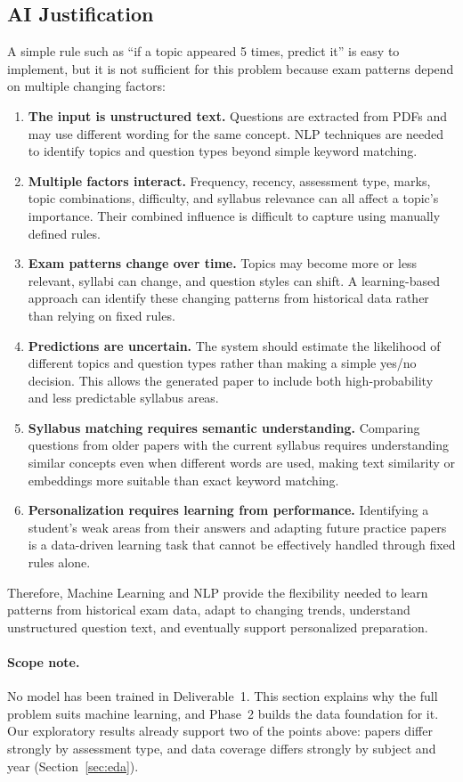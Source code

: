 \documentclass[11pt,a4paper]{article}
\begin{document}
\subsection{AI Justification}
\label{sec:ai}
A simple rule such as ``if a topic appeared 5 times, predict it'' is easy to implement, but it is not sufficient for this problem because exam patterns depend on multiple changing factors:
\begin{enumerate}
  \item \textbf{The input is unstructured text.} Questions are extracted from PDFs and may use different wording for the same concept. NLP techniques are needed to identify topics and question types beyond simple keyword matching.
  \item \textbf{Multiple factors interact.} Frequency, recency, assessment type, marks, topic combinations, difficulty, and syllabus relevance can all affect a topic's importance. Their combined influence is difficult to capture using manually defined rules.
  \item \textbf{Exam patterns change over time.} Topics may become more or less relevant, syllabi can change, and question styles can shift. A learning-based approach can identify these changing patterns from historical data rather than relying on fixed rules.
  \item \textbf{Predictions are uncertain.} The system should estimate the likelihood of different topics and question types rather than making a simple yes/no decision. This allows the generated paper to include both high-probability and less predictable syllabus areas.
  \item \textbf{Syllabus matching requires semantic understanding.} Comparing questions from older papers with the current syllabus requires understanding similar concepts even when different words are used, making text similarity or embeddings more suitable than exact keyword matching.
  \item \textbf{Personalization requires learning from performance.} Identifying a student's weak areas from their answers and adapting future practice papers is a data-driven learning task that cannot be effectively handled through fixed rules alone.
\end{enumerate}
Therefore, Machine Learning and NLP provide the flexibility needed to learn patterns from historical exam data, adapt to changing trends, understand unstructured question text, and eventually support personalized preparation.

\paragraph{Scope note.} No model has been trained in Deliverable~1. This section explains why the full problem suits machine learning, and Phase~2 builds the data foundation for it. Our exploratory results already support two of the points above: papers differ strongly by assessment type, and data coverage differs strongly by subject and year (Section~\ref{sec:eda}).
\end{document}
